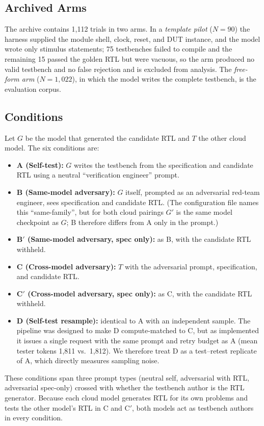 \documentclass[conference]{IEEEtran}
\begin{document}
\subsection{Archived Arms}
The archive contains 1,112 trials in two arms. In a \textit{template pilot} ($N=90$) the harness supplied the module shell, clock, reset, and DUT instance, and the model wrote only stimulus statements; 75 testbenches failed to compile and the remaining 15 passed the golden RTL but were vacuous, so the arm produced no valid testbench and no false rejection and is excluded from analysis. The \textit{free-form arm} ($N=1{,}022$), in which the model writes the complete testbench, is the evaluation corpus.

\subsection{Conditions}
Let $G$ be the model that generated the candidate RTL and $T$ the other cloud model. The six conditions are:
\begin{itemize}
    \item \textbf{A (Self-test):} $G$ writes the testbench from the specification and candidate RTL using a neutral ``verification engineer'' prompt.
    \item \textbf{B (Same-model adversary):} $G$ itself, prompted as an adversarial red-team engineer, sees specification and candidate RTL. (The configuration file names this ``same-family'', but for both cloud pairings $G'$ is the same model checkpoint as $G$; B therefore differs from A only in the prompt.)
    \item \textbf{B$'$ (Same-model adversary, spec only):} as B, with the candidate RTL withheld.
    \item \textbf{C (Cross-model adversary):} $T$ with the adversarial prompt, specification, and candidate RTL.
    \item \textbf{C$'$ (Cross-model adversary, spec only):} as C, with the candidate RTL withheld.
    \item \textbf{D (Self-test resample):} identical to A with an independent sample. The pipeline was designed to make D compute-matched to C, but as implemented it issues a single request with the same prompt and retry budget as A (mean tester tokens 1,811 vs.\ 1,812). We therefore treat D as a test--retest replicate of A, which directly measures sampling noise.
\end{itemize}
These conditions span three prompt types (neutral self, adversarial with RTL, adversarial spec-only) crossed with whether the testbench author is the RTL generator. Because each cloud model generates RTL for its own problems and tests the other model's RTL in C and C$'$, both models act as testbench authors in every condition.
\end{document}
